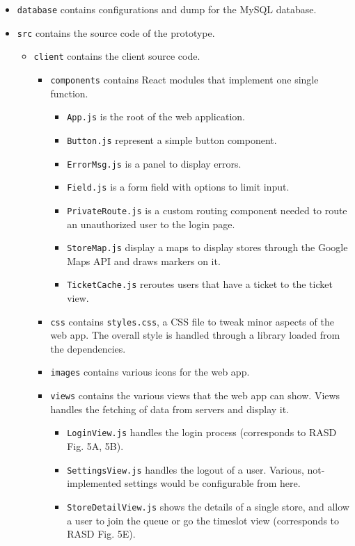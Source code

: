 \documentclass[
]{article}
\begin{document}
\begin{itemize}
  \item \texttt{database} contains configurations and dump for the MySQL database.
  \item \texttt{src} contains the source code of the prototype.
  \begin{itemize}
    \item \texttt{client} contains the client source code.
    \begin{itemize}
      \item \texttt{components} contains React modules that implement one single function.
      \begin{itemize}
        \item \texttt{App.js} is the root of the web application.
        \item \texttt{Button.js} represent a simple button component.
        \item \texttt{ErrorMsg.js} is a panel to display errors.
        \item \texttt{Field.js} is a form field with options to limit input.
        \item \texttt{PrivateRoute.js} is a custom routing component needed to route an unauthorized user to the login page.
        \item \texttt{StoreMap.js} display a maps to display stores through the Google Maps API and draws markers on it.
        \item \texttt{TicketCache.js} reroutes users that have a ticket to the ticket view.
      \end{itemize}
      \item \texttt{css} contains \texttt{styles.css}, a CSS file to tweak minor aspects of the web app. The overall style is handled through a library loaded from the dependencies.
      \item \texttt{images} contains various icons for the web app.
      \item \texttt{views} contains the various views that the web app can show. Views handles the fetching of data from servers and display it.
      \begin{itemize}
        \item \texttt{LoginView.js} handles the login process (corresponds to RASD Fig. 5A, 5B).
        \item \texttt{SettingsView.js} handles the logout of a user. Various, not-implemented settings would be configurable from here.
        \item \texttt{StoreDetailView.js} shows the details of a single store, and allow a user to join the queue or go the timeslot view (corresponds to RASD Fig. 5E).

\end{itemize}
\end{itemize}
\end{itemize}
\end{itemize}
\end{document}
